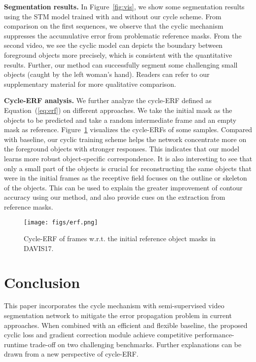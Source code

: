 \documentclass{article}
\begin{document}
\textbf{Segmentation results.} In Figure~\ref{fig:vis}, we show some segmentation results using the STM model trained with and without our cycle scheme. From comparison on the first sequences, we observe that the cyclic mechanism suppresses the accumulative error from problematic reference masks. From the second video, we see the cyclic model can depicts the boundary between foreground objects more precisely, which is consistent with the quantitative results. Further, our method can successfully segment some challenging small objects (caught by the left woman's hand). Readers can refer to our supplementary material for more qualitative comparison.

\textbf{Cycle-ERF analysis.} We further analyze the cycle-ERF defined as Equation~(\ref{eq:erf}) on different approaches. We take the initial mask as the objects to be predicted and take a random intermediate frame and an empty mask as reference. Figure~\ref{fig:erf} visualizes the cycle-ERFs of some samples. Compared with baseline, our cyclic training scheme helps the network concentrate more on the foreground objects with stronger responses. This indicates that our model learns more robust object-specific correspondence. It is also interesting to see that only a small part of the objects is crucial for reconstructing the same objects that were in the initial frames as the receptive field focuses on the outline or skeleton of the objects. This can be used to explain the greater improvement of contour accuracy using our method, and also provide cues on the extraction from reference masks.
\begin{figure}
    \centering
    \texttt{[image: figs/erf.png]}
    \caption{Cycle-ERF of frames w.r.t. the initial reference object masks in DAVIS17.}
    \label{fig:erf}
    \vspace{-5mm}
\end{figure}

\section{Conclusion}
This paper incorporates the cycle mechanism with semi-supervised video segmentation network to mitigate the error propagation problem in current approaches. When combined with an efficient and flexible baseline, the proposed cyclic loss and gradient correction module achieve competitive performance-runtime trade-off on two challenging benchmarks. Further explanations can be drawn from a new perspective of cycle-ERF.
\end{document}
